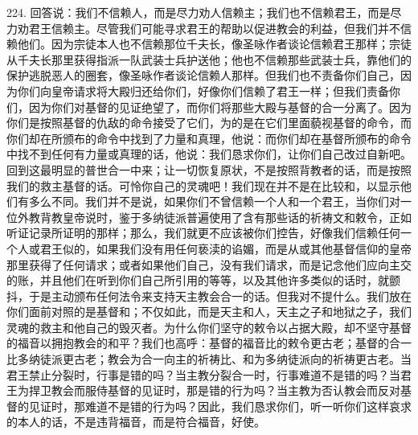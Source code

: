 224. 回答说：我们不信赖人，而是尽力劝人信赖主；我们也不信赖君王，而是尽力劝君王信赖主。尽管我们可能寻求君王的帮助以促进教会的利益，但我们并不信赖他们。因为宗徒本人也不信赖那位千夫长，像圣咏作者谈论信赖君王那样；宗徒从千夫长那里获得指派一队武装士兵护送他；他也不信赖那些武装士兵，靠他们的保护逃脱恶人的圈套，像圣咏作者谈论信赖人那样。但我们也不责备你们自己，因为你们向皇帝请求将大殿归还给你们，好像你们信赖了君王一样；但我们责备你们，因为你们对基督的见证绝望了，而你们将那些大殿与基督的合一分离了。因为你们是按照基督的仇敌的命令接受了它们，为的是在它们里面藐视基督的命令，而你们却在所颁布的命令中找到了力量和真理，他说：而你们却在基督所颁布的命令中找不到任何有力量或真理的话，他说：我们恳求你们，让你们自己改过自新吧。回到这最明显的普世合一中来；让一切恢复原状，不是按照背教者的话，而是按照我们的救主基督的话。可怜你自己的灵魂吧！我们现在并不是在比较和，以显示他们有多么不同。我们并不是说，如果你们不曾信赖一个人和一个君王，当你们对一位外教背教皇帝说时，鉴于多纳徒派普遍使用了含有那些话的祈祷文和敕令，正如听证记录所证明的那样；那么，我们就更不应该被你们控告，好像我们信赖任何一个人或君王似的，如果我们没有用任何亵渎的谄媚，而是从或其他基督信仰的皇帝那里获得了任何请求；或者如果他们自己，没有我们请求，而是记念他们应向主交的账，并且他们在听到你们自己所引用的等等，以及其他许多类似的话时，就颤抖，于是主动颁布任何法令来支持天主教会合一的话。但我对不提什么。我们放在你们面前对照的是基督和；不仅如此，而是天主和人，天主之子和地狱之子，我们灵魂的救主和他自己的毁灭者。为什么你们坚守的敕令以占据大殿，却不坚守基督的福音以拥抱教会的和平？我们也高呼：基督的福音比的敕令更古老；基督的合一比多纳徒派更古老；教会为合一向主的祈祷比、和为多纳徒派向的祈祷更古老。当君王禁止分裂时，行事是错的吗？当主教分裂合一时，行事难道不是错的吗？当君王为捍卫教会而服侍基督的见证时，那是错的行为吗？当主教为否认教会而反对基督的见证时，那难道不是错的行为吗？因此，我们恳求你们，听一听你们这样哀求的本人的话，不是违背福音，而是符合福音，好使。\par

